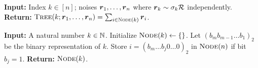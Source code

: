 \begin{algorithm}[t]
    \begin{algorithmic}[1]
        \Statex \textbf{Input:} Index $k\in[n]$; noises ${\boldsymbol{r}}_1,\ldots,{\boldsymbol{r}}_n$ where ${\boldsymbol{r}}_k\sim \sigma_k{\cal R}$ independently.
        \Statex \textbf{Return:} ${\normalfont\textsc{Tree}}(k;{\boldsymbol{r}}_1,\ldots,{\boldsymbol{r}}_n) = \sum_{i\in {\normalfont\textsc{Node}}(k)} {\boldsymbol{r}}_i$.
    \end{algorithmic}
    \caption{The {\tree} Mechanism}
    \label{alg:DP-OTB:tree}
\end{algorithm}

\begin{algorithm}[t]
    \begin{algorithmic}[1]
        \Statex \textbf{Input:} A natural number $k\in\mathbb N$.
        \State Initialize ${\normalfont\textsc{Node}}(k) \gets \{\}$. 
        \State Let $(b_m b_{m-1} \dots b_1)_2$ be the binary representation of $k$.
            \State Store $i=(b_m \ldots b_j 0 \ldots 0)_2$ in ${\normalfont\textsc{Node}}(n)$ if bit $b_j=1$.
        \EndFor
        \Statex \textbf{Return:} ${\normalfont\textsc{Node}}(k)$.
    \end{algorithmic}
    \caption{The {\node} Subroutine}
    \label{alg:DP=ORB:node}
\end{algorithm}